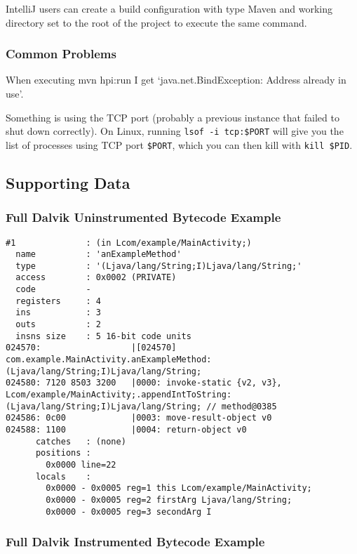 IntelliJ users can create a build configuration with type Maven and working
directory set to the root of the project to execute the same command.

\subsubsection{Common Problems}

When executing mvn hpi:run I get {\lq}java.net.BindException: Address already in
use{\rq}.

Something is using the TCP port (probably a previous instance that failed to
shut down correctly). On Linux, running {\tt lsof -i tcp:\$PORT} will give you
the list of processes using TCP port {\tt\$PORT}, which you can then kill with
{\tt kill \$PID}.


\subsection{Supporting Data}

\subsubsection{Full Dalvik Uninstrumented Bytecode Example}
\label{sec:sec:full_dalvik_bytecode_example}

\begin{lstlisting}
#1              : (in Lcom/example/MainActivity;)
  name          : 'anExampleMethod'
  type          : '(Ljava/lang/String;I)Ljava/lang/String;'
  access        : 0x0002 (PRIVATE)
  code          -
  registers     : 4
  ins           : 3
  outs          : 2
  insns size    : 5 16-bit code units
024570:                  |[024570] com.example.MainActivity.anExampleMethod:(Ljava/lang/String;I)Ljava/lang/String;
024580: 7120 8503 3200   |0000: invoke-static {v2, v3}, Lcom/example/MainActivity;.appendIntToString:(Ljava/lang/String;I)Ljava/lang/String; // method@0385
024586: 0c00             |0003: move-result-object v0
024588: 1100             |0004: return-object v0
      catches   : (none)
      positions :
        0x0000 line=22
      locals    :
        0x0000 - 0x0005 reg=1 this Lcom/example/MainActivity;
        0x0000 - 0x0005 reg=2 firstArg Ljava/lang/String;
        0x0000 - 0x0005 reg=3 secondArg I
\end{lstlisting}

\subsubsection{Full Dalvik Instrumented Bytecode Example}
\label{sec:sec:full_dalvik_instrumented_bytecode_example}

